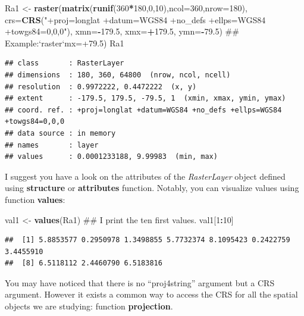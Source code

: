 \documentclass[]{report}
\newenvironment{Shaded}{\begin{snugshade}}{\end{snugshade}}
\newcommand{\DataTypeTok}[1]{\textcolor[rgb]{0.13,0.29,0.53}{#1}}
\newcommand{\DecValTok}[1]{\textcolor[rgb]{0.00,0.00,0.81}{#1}}
\newcommand{\FloatTok}[1]{\textcolor[rgb]{0.00,0.00,0.81}{#1}}
\newcommand{\KeywordTok}[1]{\textcolor[rgb]{0.13,0.29,0.53}{\textbf{#1}}}
\newcommand{\NormalTok}[1]{#1}
\newcommand{\OperatorTok}[1]{\textcolor[rgb]{0.81,0.36,0.00}{\textbf{#1}}}
\newcommand{\StringTok}[1]{\textcolor[rgb]{0.31,0.60,0.02}{#1}}
\begin{document}
\begin{Shaded}
\begin{Highlighting}[]
\NormalTok{Ra1 <-}\StringTok{ }\KeywordTok{raster}\NormalTok{(}\KeywordTok{matrix}\NormalTok{(}\KeywordTok{runif}\NormalTok{(}\DecValTok{360}\OperatorTok{*}\DecValTok{180}\NormalTok{,}\DecValTok{0}\NormalTok{,}\DecValTok{10}\NormalTok{),}\DataTypeTok{ncol=}\DecValTok{360}\NormalTok{,}\DataTypeTok{nrow=}\DecValTok{180}\NormalTok{),}
    \DataTypeTok{crs=}\KeywordTok{CRS}\NormalTok{(}\StringTok{"+proj=longlat +datum=WGS84 +no_defs +ellps=WGS84 +towgs84=0,0,0"}\NormalTok{),}
    \DataTypeTok{xmn=}\OperatorTok{-}\FloatTok{179.5}\NormalTok{, }\DataTypeTok{xmx=}\OperatorTok{+}\FloatTok{179.5}\NormalTok{, }\DataTypeTok{ymn=}\OperatorTok{-}\FloatTok{79.5}\NormalTok{) ## Example:`raster`mx=+79.5)}
\NormalTok{Ra1}
\end{Highlighting}
\end{Shaded}

\begin{verbatim}
## class       : RasterLayer 
## dimensions  : 180, 360, 64800  (nrow, ncol, ncell)
## resolution  : 0.9972222, 0.4472222  (x, y)
## extent      : -179.5, 179.5, -79.5, 1  (xmin, xmax, ymin, ymax)
## coord. ref. : +proj=longlat +datum=WGS84 +no_defs +ellps=WGS84 +towgs84=0,0,0 
## data source : in memory
## names       : layer 
## values      : 0.0001233188, 9.99983  (min, max)
\end{verbatim}

I suggest you have a look on the attributes of the \emph{RasterLayer}
object defined using \textbf{structure} or \textbf{attributes} function.
Notably, you can visualize values using function \textbf{values}:

\begin{Shaded}
\begin{Highlighting}[]
\NormalTok{val1 <-}\StringTok{ }\KeywordTok{values}\NormalTok{(Ra1)}
\NormalTok{## I print the ten first values.}
\NormalTok{val1[}\DecValTok{1}\OperatorTok{:}\DecValTok{10}\NormalTok{]}
\end{Highlighting}
\end{Shaded}

\begin{verbatim}
##  [1] 5.8853577 0.2950978 1.3498855 5.7732374 8.1095423 0.2422759 3.4455910
##  [8] 6.5118112 2.4460790 6.5183816
\end{verbatim}

You may have noticed that there is no ``proj4string'' argument but a CRS
argument. However it exists a common way to access the CRS for all the
spatial objects we are studying: function \textbf{projection}.
\end{document}
